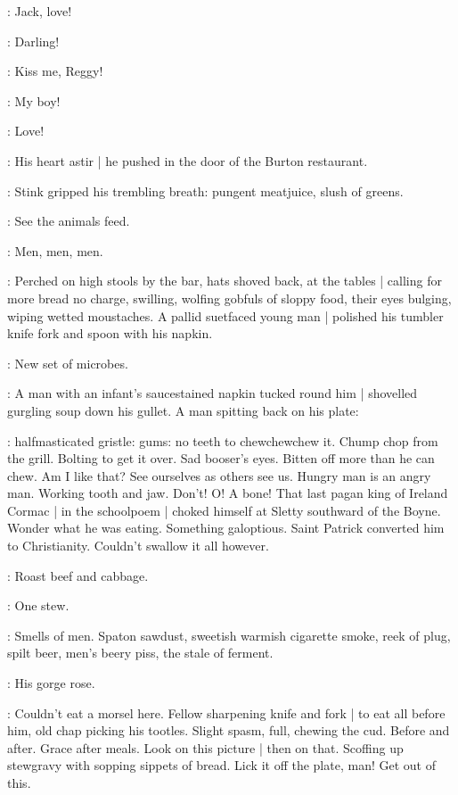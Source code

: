 :
Jack,
love!

:
Darling!

:
Kiss me,
Reggy!

:
My boy!

:
Love!

:
His heart astir |
he pushed in the door of the Burton restaurant.

:
Stink gripped his trembling breath:
pungent meatjuice, slush of greens.

\BloomInt:
See the animals feed.

\BloomInt:
Men, men, men.

:
Perched on high stools by the bar,
hats shoved back,
at the tables |
calling for more bread no charge,
swilling,
wolfing gobfuls of sloppy food,
their eyes bulging,
wiping wetted moustaches.
A pallid suetfaced young man |
polished his tumbler knife fork and spoon with his napkin.

\BloomInt:
New set of microbes.

:
A man with an infant's saucestained napkin tucked round him |
shovelled gurgling soup down his gullet.
A man spitting back on his plate:

\BloomInt:
halfmasticated gristle:
gums:
no teeth to chewchewchew it.
Chump chop from the grill.
Bolting to get it over.
Sad booser's eyes.
Bitten off more than he can chew.
Am I like that?
See ourselves as others see us.
Hungry man is an angry man.
Working tooth and jaw.
Don't!
O! A bone!
That last pagan king of Ireland Cormac |
in the schoolpoem |
choked himself at Sletty southward of the Boyne.
Wonder what he was eating.
Something galoptious.
Saint Patrick converted him to Christianity.
Couldn't swallow it all however.

:
Roast beef and cabbage.

:
One stew.

\BloomInt:
Smells of men.
Spaton sawdust,
sweetish warmish cigarette smoke,
reek of plug,
spilt beer,
men's beery piss,
the stale of ferment.

:
His gorge rose.

\BloomInt:
Couldn't eat a morsel here.
Fellow sharpening knife and fork |
to eat all before him,
old chap picking his tootles.
Slight spasm, full, chewing the cud.
Before and after.
Grace after meals.
Look on this picture |
then on that.
Scoffing up stewgravy with sopping sippets of bread.
Lick it off the plate, man!
Get out of this.

